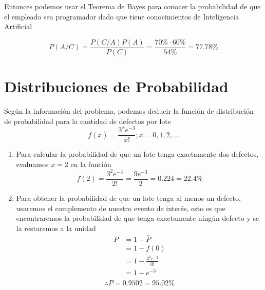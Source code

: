 \documentclass[12pt, letterpaper]{article}
\begin{document}
\newpage

Entonces podemos usar el Teorema de Bayes para conocer la probabilidad de que el empleado sea programador dado que tiene conocimientos de Inteligencia Artificial

\begin{equation*}
    P(A/C) = \frac{P(C/A)P(A)}{P(C)} = \frac{70\% \cdot 60\%}{54\%} = 77.78\%
\end{equation*}

\section{Distribuciones de Probabilidad}
Según la información del problema, podemos deducir la función de distribución de probabilidad para la cantidad de defectos por lote
\begin{equation*}
    f(x) = \frac{3^{x}e^{-3}}{x!}; x = 0, 1, 2, ...
\end{equation*}
\begin{enumerate}
    \item Para calcular la probabilidad de que un lote tenga exactamente dos defectos, evaluamos $ x = 2 $ en la función
    \begin{equation*}
        f(2) = \frac{3^{2}e^{-3}}{2!} = \frac{9e^{-3}}{2} = 0.224 = 22.4\%
    \end{equation*}
    \item Para obtener la probabilidad de que un lote tenga al menos un defecto, usaremos el complemento de nuestro evento de interés, esto es que encontraremos la probabilidad de que tenga exactamente ningún defecto y se la restaremos a la unidad
    \begin{equation*}
        \begin{aligned}
            P
            & = 1 - \bar{P} \\
            & = 1 - f(0) \\
            & = 1 - \frac{3^{0}e^{-3}}{0!} \\
            & = 1 - e^{-3} \\
        \end{aligned}
    \end{equation*}
    \begin{equation*}
        \therefore P = 0.9502 = 95.02\%
    \end{equation*}
\end{enumerate}

\newpage
\end{document}
